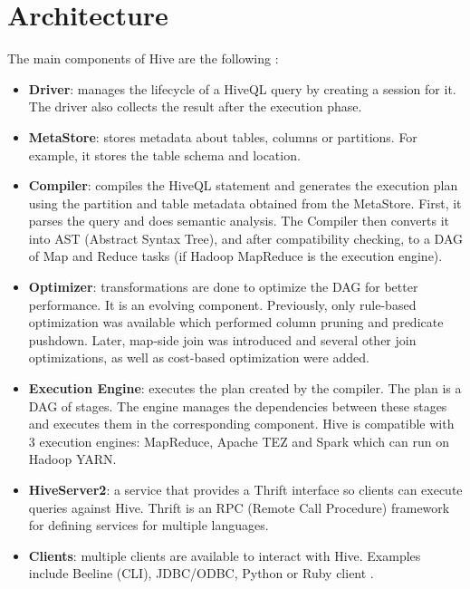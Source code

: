 \section{Architecture}
The main components of Hive are the following \cite{Hive-paper}:
\begin{itemize}
	\item \textbf{Driver}: manages the lifecycle of a HiveQL query by creating a session for it. The driver also collects the result after the execution phase.
	\item  \textbf{MetaStore}: stores metadata about tables, columns or partitions. For example, it stores the table schema and location.
	\item \textbf{Compiler}: compiles the HiveQL statement and generates the execution plan using the partition and table metadata obtained from the MetaStore. First, it parses the query and does semantic analysis. The Compiler then converts it into AST (Abstract Syntax Tree), and after compatibility checking, to a DAG of Map and Reduce tasks (if Hadoop MapReduce is the execution engine). 
	\item \textbf{Optimizer}: transformations are done to optimize the DAG for better performance. It is an evolving component. Previously, only rule-based optimization was available which performed column pruning and predicate pushdown. Later, map-side join was introduced and several other join optimizations, as well as cost-based optimization were added.
	\item \textbf{Execution Engine}: executes the plan created by the compiler. The plan is a DAG of stages. The engine manages the dependencies between these stages and executes them in the corresponding component. Hive is compatible with 3 execution engines: MapReduce, Apache TEZ and Spark which can run on Hadoop YARN.
	\item \textbf{HiveServer2}: a service that provides a Thrift interface so clients can execute queries against Hive. Thrift is an RPC (Remote Call Procedure) framework for defining services for multiple languages.
	\item \textbf{Clients}: multiple clients are available to interact with Hive. Examples include Beeline (CLI), JDBC/ODBC, Python or Ruby client \etc.
\end{itemize}

